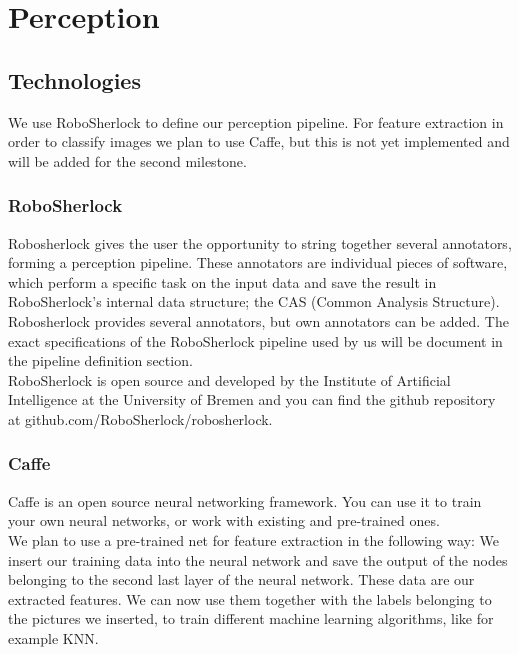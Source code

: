 \documentclass[main.tex]{subfiles}
\begin{document}
	
	\chapter{Perception}
 	
 	\section{Technologies}
 	We use RoboSherlock to define our perception pipeline. For feature extraction in order to classify images we plan to use Caffe, but this is not yet implemented 
 	and will be added for the second milestone.
 	
 	\subsection{RoboSherlock}
	Robosherlock gives the user the opportunity to string together several annotators, forming a perception pipeline. These annotators are individual pieces of
	software, which perform a specific task on the input data and save the result in RoboSherlock's internal data structure; the CAS (Common Analysis Structure).
	Robosherlock provides several annotators, but own annotators can be added. The exact specifications of the RoboSherlock pipeline used by us will be document in
	the pipeline definition section.\\
	
	RoboSherlock is open source and developed by the Institute of Artificial Intelligence at the University of Bremen and you can find the github repository at 			github.com/RoboSherlock/robosherlock.
 	
 	\subsection{Caffe}
 	Caffe is an open source neural networking framework. You can use it to train your own neural networks, or work with existing and pre-trained ones.\\
 	
 	We plan to use a pre-trained net for feature extraction in the following way: We insert our training data into the neural network and save the output of the 			nodes belonging to the second last layer of the neural network. These data are our extracted features. We can now use them together with the labels belonging to 	the pictures we inserted, to train different machine learning algorithms, like for example KNN.\\
 	
\end{document}
